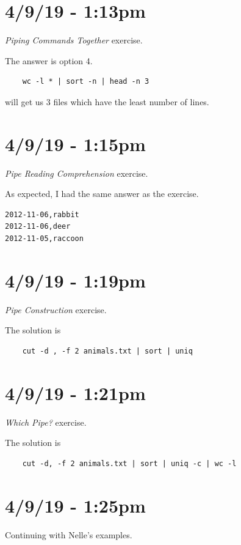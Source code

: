 \documentclass{article}
\begin{document}
\section*{4/9/19 - 1:13pm}

\textit{Piping Commands Together} exercise.

The answer is option 4. \begin{verbatim}
    wc -l * | sort -n | head -n 3
\end{verbatim} will get us 3 files which have the least number of lines.

\section*{4/9/19 - 1:15pm}

\textit{Pipe Reading Comprehension} exercise.

As expected, I had the same answer as the exercise.

\begin{verbatim}
2012-11-06,rabbit
2012-11-06,deer
2012-11-05,raccoon
\end{verbatim}

\section*{4/9/19 - 1:19pm}

\textit{Pipe Construction} exercise.

The solution is \begin{verbatim}
    cut -d , -f 2 animals.txt | sort | uniq
\end{verbatim}

\section*{4/9/19 - 1:21pm}

\textit{Which Pipe?} exercise.

The solution is \begin{verbatim}
    cut -d, -f 2 animals.txt | sort | uniq -c | wc -l
\end{verbatim}

\section*{4/9/19 - 1:25pm}

Continuing with Nelle's examples.
\end{document}
